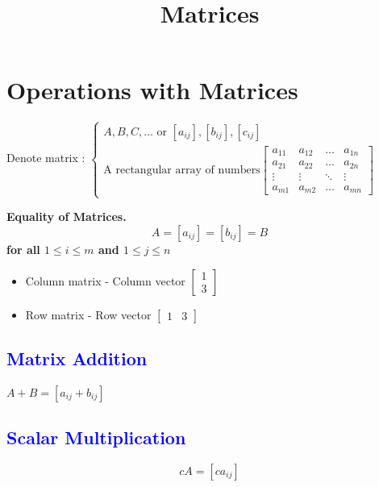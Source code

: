 \documentclass{article}
\title{Matrices}
\date{}
\begin{document}
    \section{Operations with Matrices}

    Denote matrix : $ \begin{cases}{}
        A, B, C, \dots \text{ or  } [a_{ij}], [b_{ij}], [c_{ij}] \\
        \text{A rectangular array of numbers} \begin{bmatrix}
            a_{11} & a_{12} & \dots & a_{1n} \\
            a_{21} & a_{22} & \dots & a_{2n} \\
            \vdots & \vdots & \ddots & \vdots \\
            a_{m1} & a_{m2} & \dots & a_{mn}
        \end{bmatrix}
    \end{cases}$

    \begin{tcolorbox}
        \bf{Equality of Matrices.} 
        \[ A = [a_{ij}] = [b_{ij}] = B \] for all $1 \leq i \leq m$  and $1 \le j \le n$
    \end{tcolorbox}

    \begin{itemize}
        \item Column matrix - Column vector 
            $\begin{bmatrix}
                1 \\
                3
            \end{bmatrix}$
        \item Row matrix - Row vector
            $ \begin{bmatrix}
                1 & 3
            \end{bmatrix}$
    \end{itemize}

    \subsection*{\textcolor{blue}{Matrix Addition}}
        \begin{tcolorbox}
            $A + B = [a_{ij} + b_{ij}]$
        \end{tcolorbox}

    \subsection*{\textcolor{blue}{Scalar Multiplication}}
        \begin{tcolorbox}
            \[ cA = [ca_{ij}] \]
        \end{tcolorbox}
\end{document}
